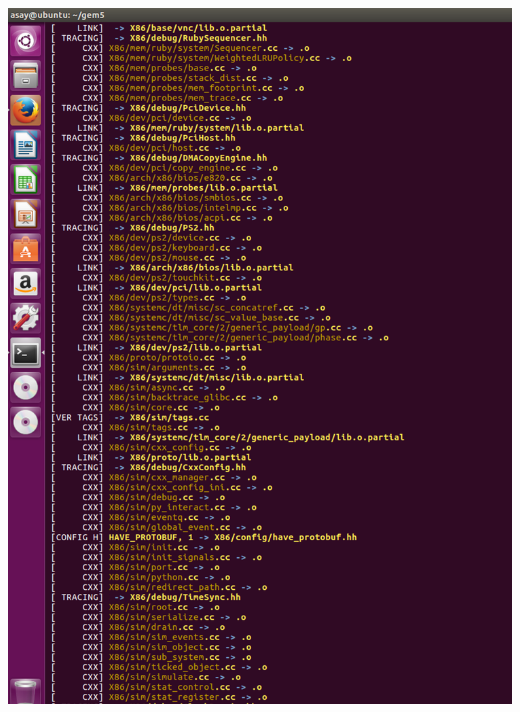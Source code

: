 \documentclass{article}
\begin{document}
\begin{center}
	\includegraphics[width=1\textwidth]{build2}

\end{center}
\end{document}
